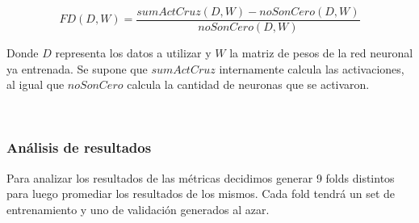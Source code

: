 \documentclass[informe.tex]{subfiles}
\begin{document}
      $$FD(D, W) = \frac{sumActCruz(D, W) - noSonCero(D, W)}{noSonCero(D, W)}$$
      
      Donde $D$ representa los datos a utilizar y $W$ la matriz de pesos de la red neuronal ya entrenada. Se supone que $sumActCruz$ internamente calcula las activaciones, al igual que $noSonCero$ calcula la cantidad de neuronas que se activaron.
      
      ~
      \subsubsection{Análisis de resultados}
      Para analizar los resultados de las métricas decidimos generar 9 folds distintos para luego promediar los resultados de los mismos. Cada fold tendrá un set de entrenamiento y uno de validación generados al azar.
    
      
      
\end{document}
